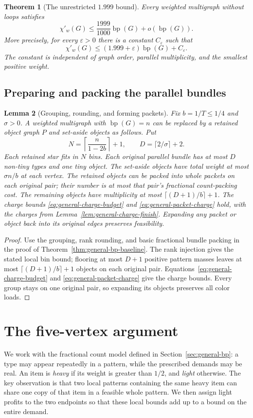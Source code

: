 \documentclass[11pt]{article}
\newtheorem{theorem}{Theorem}[section]
\newtheorem{lemma}[theorem]{Lemma}
\theoremstyle{definition}\newtheorem{algorithm}{Algorithm}[section]
\numberwithin{equation}{section}
\theoremstyle{remark}\newtheorem*{remark}{Remark}
\newcommand{\bp}{\operatorname{bp}}
\begin{document}
\clearpage
\begin{theorem}[The unrestricted $1.999$ bound]
\label{thm:general-bp-subtwo}
Every weighted multigraph without loops satisfies
\[
 \chi'_w(G)\le\frac{1999}{1000}\bp(G)+o(\bp(G)).
\]
More precisely, for every $\varepsilon>0$ there is a constant
$C_\varepsilon$ such that
\[
 \chi'_w(G)\le(1.999+\varepsilon)\bp(G)+C_\varepsilon.
\]
The constant is independent of graph order, parallel multiplicity,
and the smallest positive weight.
\end{theorem}

\subsection{Preparing and packing the parallel bundles}
\begin{lemma}[Grouping, rounding, and forming packets]
\label{lem:general-packet-preprocess}
Fix $b=1/T\le1/4$ and $\sigma>0$. A weighted multigraph with
$\bp(G)=n$ can be replaced by a retained object graph $P$ and
set-aside objects as follows. Put
\[
 N=\left\lceil\frac{n}{1-2b}\right\rceil+1,
 \qquad D=\lceil2/\sigma\rceil+2.
\]
Each retained star fits in $N$ bins. Each original parallel bundle has
at most $D$ non-tiny types and one tiny object. The set-aside objects
have total weight at most $\sigma n/b$ at each vertex. The retained
objects can be packed into whole packets on each original pair; their
number is at most that pair's fractional count-packing cost. The
remaining objects have multiplicity at most $\lceil(D+1)/b\rceil+1$.
The charge bounds \eqref{eq:general-charge-budget} and
\eqref{eq:general-packet-charge} hold, with the charges from
Lemma~\ref{lem:general-charge-finish}. Expanding any packet or object
back into its original edges preserves feasibility.
\end{lemma}
\begin{proof}
Use the grouping, rank rounding, and basic fractional bundle packing
in the proof of Theorem~\ref{thm:general-bp-baseline}.
The rank injection gives the stated local bin bound; flooring at most
$D+1$ positive pattern masses leaves at most
$\lceil(D+1)/b\rceil+1$ objects on each original pair.
Equations~\eqref{eq:general-charge-budget} and
\eqref{eq:general-packet-charge} give the charge bounds.
Every group stays on one original pair, so expanding its objects
preserves all color loads.
\end{proof}

\section{The five-vertex argument}\label{sec:subtwo-local}
We work with the fractional count model defined in
Section~\ref{sec:general-bp}: a type may appear repeatedly in a pattern,
while the prescribed demands may be real. An item is \emph{heavy} if
its weight is greater than $1/2$, and \emph{light} otherwise.
The key observation is that two local patterns containing the same
heavy item can share one copy of that item in a feasible whole pattern.
We then assign light profits to the two endpoints so that these local
bounds add up to a bound on the entire demand.
\end{document}
